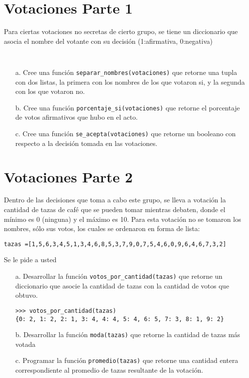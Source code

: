 \section{Votaciones Parte 1}
Para ciertas votaciones no secretas de cierto grupo, se tiene un diccionario que asocia el nombre del votante con su decisión (1:afirmativa, 0:negativa)

\begin{lstlisting}[style=consola]


\end{lstlisting}

\begin{itemize}
    \item[a.] Cree una función \texttt{separar\_nombres(votaciones)} que retorne una tupla con dos listas, la primera con los nombres de los que votaron si, y la segunda con los que votaron no.
    \item[b.] Cree una función \texttt{porcentaje\_si(votaciones)} que retorne el porcentaje de votos afirmativos que hubo en el acto.
    \item[c.] Cree una función \texttt{se\_acepta(votaciones)} que retorne un booleano con respecto a la decisión tomada en las votaciones.
\end{itemize}

\section{Votaciones Parte 2}

Dentro de las decisiones que toma a cabo este grupo, se lleva a votación la cantidad de tazas de café que se pueden tomar mientras debaten, donde el mínimo es 0 (ninguna) y el máximo es 10. Para esta votación no se tomaron los nombres, sólo sus votos, los cuales se ordenaron en forma de lista:

\begin{lstlisting}[style=consola]
tazas =[1,5,6,3,4,5,1,3,4,6,8,5,3,7,9,0,7,5,4,6,0,9,6,4,6,7,3,2]
\end{lstlisting}

Se le pide a usted

\begin{itemize}
    \item[a.] Desarrollar la función \texttt{votos\_por\_cantidad(tazas)} que retorne un diccionario que asocie la cantidad de tazas con la cantidad de votos que obtuvo.
    \begin{lstlisting}[style=consola]
>>> votos_por_cantidad(tazas)
{0: 2, 1: 2, 2: 1, 3: 4, 4: 4, 5: 4, 6: 5, 7: 3, 8: 1, 9: 2}
    \end{lstlisting}
    \item[b.] Desarrollar la función \texttt{moda(tazas)} que retorne la cantidad de tazas más votada
    \item[c.] Programar la función \texttt{promedio(tazas)} que retorne una cantidad entera correspondiente al promedio de tazas resultante de la votación.
\end{itemize}